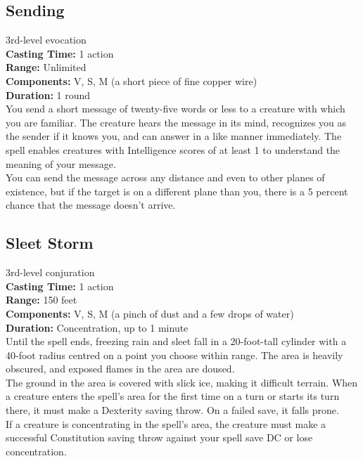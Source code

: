 \documentclass[11pt, A4paper, english]{article}
\begin{document}
		\subsection{Sending}
3rd-level evocation \\
\textbf{Casting Time:} 1 action \\
\textbf{Range:} Unlimited \\
\textbf{Components:} V, S, M (a short piece of fine copper wire) \\
\textbf{Duration:} 1 round \\
You send a short message of twenty-five words or less to a creature with which you are familiar. The creature hears the message in its mind, recognizes you as the sender if it knows you, and can answer in a like manner immediately. The spell enables creatures with Intelligence scores of at least 1 to understand the meaning of your message. \\
You can send the message across any distance and even to other planes of existence, but if the target is on a different plane than you, there is a 5 percent chance that the message doesn't arrive.

		\subsection{Sleet Storm}
3rd-level conjuration \\
\textbf{Casting Time:} 1 action \\
\textbf{Range:} 150 feet \\
\textbf{Components:} V, S, M (a pinch of dust and a few drops of water) \\
\textbf{Duration:} Concentration, up to 1 minute \\
Until the spell ends, freezing rain and sleet fall in a 20-foot-tall cylinder with a 40-foot radius centred on a point you choose within range. The area is heavily obscured, and exposed flames in the area are doused. \\
The ground in the area is covered with slick ice, making it difficult terrain. When a creature enters the spell’s area for the first time on a turn or starts its turn there, it must make a Dexterity saving throw. On a failed save, it falls prone. \\
If a creature is concentrating in the spell’s area, the creature must make a successful Constitution saving throw against your spell save DC or lose concentration.
\end{document}

